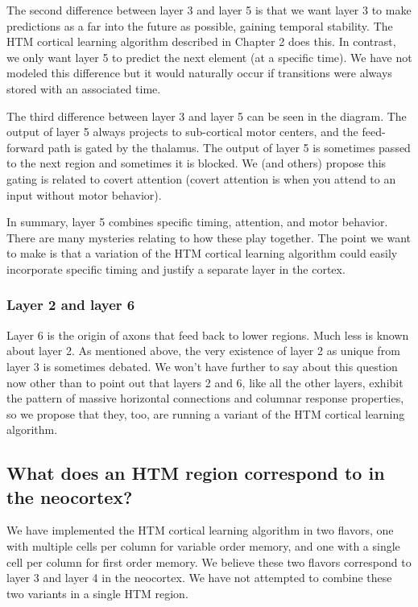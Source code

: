 \documentclass{report}
\begin{document}
The second difference between layer 3 and layer 5 is that we want
layer 3 to make predictions as a far into the future as possible,
gaining temporal stability. The HTM cortical learning algorithm
described in Chapter 2 does this. In contrast, we only want layer 5 to
predict the next element (at a specific time). We have not modeled
this difference but it would naturally occur if transitions were
always stored with an associated time.

The third difference between layer 3 and layer 5 can be seen in the
diagram. The output of layer 5 always projects to sub-cortical motor
centers, and the feed-forward path is gated by the thalamus. The
output of layer 5 is sometimes passed to the next region and sometimes
it is blocked. We (and others) propose this gating is related to
covert attention (covert attention is when you attend to an input
without motor behavior).

In summary, layer 5 combines specific timing, attention, and motor
behavior. There are many mysteries relating to how these play
together. The point we want to make is that a variation of the HTM
cortical learning algorithm could easily incorporate specific timing
and justify a separate layer in the cortex.

\subsubsection*{Layer 2 and layer 6}
Layer 6 is the origin of axons that feed back to lower regions. Much
less is known about layer 2. As mentioned above, the very existence of
layer 2 as unique from layer 3 is sometimes debated. We won't have
further to say about this question now other than to point out that
layers 2 and 6, like all the other layers, exhibit the pattern of
massive horizontal connections and columnar response properties, so we
propose that they, too, are running a variant of the HTM cortical
learning algorithm.

\subsection*{What does an HTM region correspond to in the neocortex?}
We have implemented the HTM cortical learning algorithm in two
flavors, one with multiple cells per column for variable order memory,
and one with a single cell per column for first order memory. We
believe these two flavors correspond to layer 3 and layer 4 in the
neocortex. We have not attempted to combine these two variants in a
single HTM region.
\end{document}

